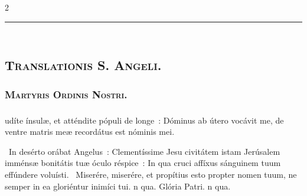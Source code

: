 \documentclass[9pt,twoside]{extarticle}
\begin{document}
\begin{multicols}{2}
\begin{center}\textcolor{red}{\rule{\linewidth}{0.5pt}} \end{center}

\subsection*{\center \textsc{\\ 
Translationis S. Angeli.}}
\subsubsection*{\center \textsc{Martyris Ordinis Nostri.}}
\subsubsection*{\center {}}

\begin{tightlist}{}
\item {}
\end{tightlist}

\subsubsection*{}
udíte ínsulæ, et atténdite pópuli de longe~: Dóminus ab útero vocávit me, de ventre matris meæ recordátus est nóminis mei.


\begin{tightlist}{}
\item {}~In desérto orábat Angelus~: Clementíssime Jesu civitátem istam Jerúsalem imménsæ bonitátis tuæ óculo réspice~: \textred{*} In qua cruci affíxus sánguinem tuum effúndere voluísti.
~Miserére, miserére, et propítius esto propter nomen tuum, ne semper in ea gloriéntur inimíci tui. n qua. Glória Patri. n qua.
\end{tightlist}


\end{multicols}
\end{document}
